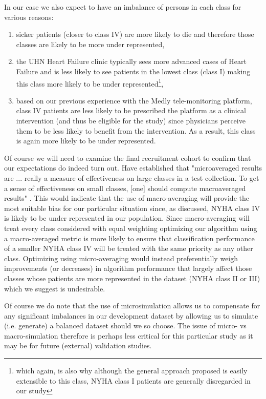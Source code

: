 \documentclass[]{article}
\begin{document}
In our case we also expect to have an imbalance of persons in each class for various reasons: 
\begin{enumerate}[label=\alph*)]
	\item sicker patients (closer to class IV) are more likely to die and therefore those classes are likely to be more under represented,
	\item the UHN Heart Failure clinic typically sees more advanced cases of Heart Failure and is less likely to see patients in the lowest class (class I) making this class more likely to be under represented\footnote{which again, is also why although the general approach proposed is easily extensible to this class, NYHA class I patients are generally disregarded in our study},
	\item based on our previous experience with the Medly tele-monitoring platform, class IV patients are less likely to be prescribed the platform as a clinical intervention (and thus be eligible for the study) since physicians perceive them to be less likely to benefit from the intervention. As a result, this class is again more likely to be under represented.
\end{enumerate}

Of course we will need to examine the final recruitment cohort to confirm that our expectations do indeed turn out. Have established that "microaveraged results are ... really a measure of effectiveness on large classes in a test collection. To get a sense of effectiveness on small classes, [one] should compute macroaveraged results" \cite{Manning2009}. This would indicate that the use of macro-averaging will provide the most suitable bias for our particular situation since, as discussed, NYHA class IV is likely to be under represented in our population. Since macro-averaging will treat every class considered with equal weighting optimizing our algorithm using a macro-averaged metric is more likely to ensure that classification performance of a smaller NYHA class IV will be treated with the same priority as any other class. Optimizing using micro-averaging would instead preferentially weigh improvements (or decreases) in algorithm performance that largely affect those classes whose patients are more represented in the dataset (NYHA class II or III) which we suggest is undesirable.

Of course we do note that the use of microsimulation allows us to compensate for any significant imbalances in our development dataset by allowing us to simulate (i.e. generate) a balanced dataset should we so choose.  The issue of micro- vs macro-simulation therefore is perhaps less critical for this particular study as it may be for future (external) validation studies.
\end{document}
